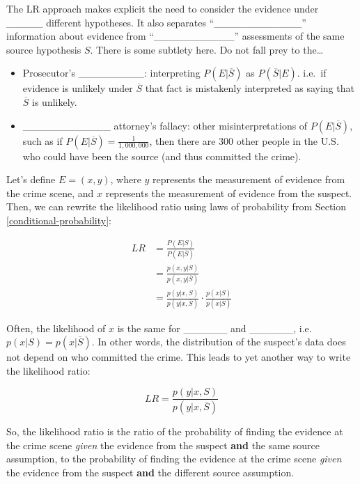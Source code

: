 \documentclass[]{book}
\providecommand{\tightlist}{%
  \setlength{\itemsep}{0pt}\setlength{\parskip}{0pt}}
\theoremstyle{definition}
\theoremstyle{definition}
\theoremstyle{remark}
\begin{document}
The LR approach makes explicit the need to consider the evidence under
\_\_\_\_\_ different hypotheses. It also separates
``\_\_\_\_\_\_\_\_\_\_\_\_'' information about evidence from
``\_\_\_\_\_\_\_\_\_\_\_'' assessments of the same source hypothesis
\(S\). There is some subtlety here. Do not fall prey to the\ldots{}

\begin{itemize}
\tightlist
\item
  Prosecutor's \_\_\_\_\_\_\_\_\_: interpreting \(P(E|\overline{S})\) as
  \(P(\overline{S}|E)\). i.e.~if evidence is unlikely under
  \(\overline{S}\) that fact is mistakenly interpreted as saying that
  \(\overline{S}\) is unlikely. \vspace{.1in}
\item
  \_\_\_\_\_\_\_\_\_\_\_\_ attorney's fallacy: other misinterpretations
  of \(P(E|\overline{S})\), such as if
  \(P(E|\overline{S}) = \frac{1}{1,000,000}\), then there are 300 other
  people in the U.S. who could have been the source (and thus committed
  the crime).
\end{itemize}

Let's define \(E=(x,y)\), where \(y\) represents the measurement of
evidence from the crime scene, and \(x\) represents the measurement of
evidence from the suspect. Then, we can rewrite the likelihood ratio
using laws of probability from Section \ref{conditional-probability}:

\begin{equation}\label{eq:lrredo}
\begin{split}
LR & = \frac{P(E|S)}{P(E|\overline{S})} \\
  & = \frac{p(x,y | S)}{p(x,y | \overline{S})} \\ 
  & = \frac{p(y | x, S)}{p(y | x, \overline{S})} \cdot \frac{p(x| S)}{p(x| \overline{S})} 
\end{split}
\end{equation}

Often, the likelihood of \(x\) is the same for \_\_\_\_\_\_ and
\_\_\_\_\_\_, i.e. \(p(x| S)= p(x| \overline{S})\). In other words, the
distribution of the suspect's data does not depend on who committed the
crime. This leads to yet another way to write the likelihood ratio:

\begin{equation}\label{eq:lr3}
LR = \frac{p(y | x, S)}{p(y | x, \overline{S})}
\end{equation}

So, the likelihood ratio is the ratio of the probability of finding the
evidence at the crime scene \emph{given} the evidence from the suspect
\textbf{and} the same source assumption, to the probability of finding
the evidence at the crime scene \emph{given} the evidence from the
suspect \textbf{and} the different source assumption.
\end{document}
